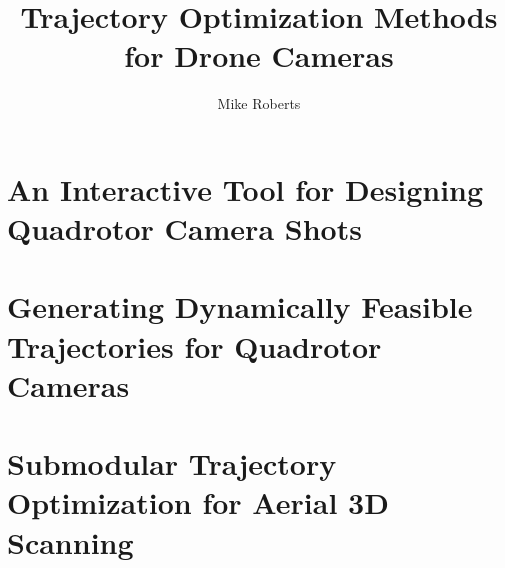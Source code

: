 \documentclass{report}
\begin{document}
\newcommand{\shortcite}[1]{\cite{#1}}

\title{Trajectory Optimization Methods for Drone Cameras}
\author{Mike Roberts}

\beforepreface




\afterpreface



\chapter{An Interactive Tool for Designing Quadrotor Camera Shots}















\chapter{Generating Dynamically Feasible Trajectories for Quadrotor Cameras}










\chapter{Submodular Trajectory Optimization for Aerial 3D Scanning}









\appendix





\end{document}
